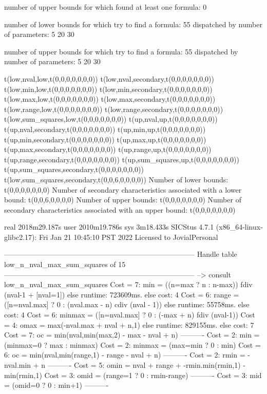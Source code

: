 number of upper bounds for which found at least one formula: 0

number of lower bounds for which try to find a formula: 55
dispatched by number of parameters: 5  20  30

number of upper bounds for which try to find a formula: 55
dispatched by number of parameters: 5  20  30

t(low,nval,low,t(0,0,0,0,0,0,0))
t(low,nval,secondary,t(0,0,0,0,0,0,0))
t(low,min,low,t(0,0,0,0,0,0,0))
t(low,min,secondary,t(0,0,0,0,0,0,0))
t(low,max,low,t(0,0,0,0,0,0,0))
t(low,max,secondary,t(0,0,0,0,0,0,0))
t(low,range,low,t(0,0,0,0,0,0,0))
t(low,range,secondary,t(0,0,0,0,0,0,0))
t(low,sum_squares,low,t(0,0,0,0,0,0,0))
t(up,nval,up,t(0,0,0,0,0,0,0))
t(up,nval,secondary,t(0,0,0,0,0,0,0))
t(up,min,up,t(0,0,0,0,0,0,0))
t(up,min,secondary,t(0,0,0,0,0,0,0))
t(up,max,up,t(0,0,0,0,0,0,0))
t(up,max,secondary,t(0,0,0,0,0,0,0))
t(up,range,up,t(0,0,0,0,0,0,0))
t(up,range,secondary,t(0,0,0,0,0,0,0))
t(up,sum_squares,up,t(0,0,0,0,0,0,0))
t(up,sum_squares,secondary,t(0,0,0,0,0,0,0))
t(low,sum_squares,secondary,t(0,0,6,0,0,0,0))
Number of lower bounds:                                             t(0,0,0,0,0,0,0)
Number of secondary characteristics associated with a lower bound:  t(0,0,6,0,0,0,0)
Number of upper bounds:                                             t(0,0,0,0,0,0,0)
Number of secondary characteristics associated with an upper bound: t(0,0,0,0,0,0,0)

real	2018m29.187s
user	2010m19.786s
sys	3m18.433s
SICStus 4.7.1 (x86_64-linux-glibc2.17): Fri Jan 21 10:45:10 PST 2022
Licensed to JovialPersonal


--------------------------------------------------------------------------------
Handle table low_n_nval_max_sum_squares of 15
--------------------------------------------------------------------------------
--> consult low_n_nval_max_sum_squares
Cost =  7:  min    = ((n=max ? n : n-max)) fdiv (nval-1 + [nval=1]) %
else runtime: 723609ms. else cost: 4
Cost =  6:  range  = ([n=nval.max] ? 0 : (nval.max - n) cdiv (nval - 1)) %
else runtime: 55758ms. else cost: 4
Cost =  6:  minmax = ([n=nval.max] ? 0 : (-max + n) fdiv (nval-1)) %
Cost =  4:  omax   = max(-nval.max + nval + n,1)
else runtime: 829155ms. else cost: 7
Cost =  7:  oc     = min(nval,min(max,2) - max - nval + n) %
----------
Cost =  2:  min    = (minmax=0 ? max : minmax)
Cost =  2:  minmax = (max=min ? 0 : min)
Cost =  6:  oc     = min(nval,min(range,1) - range - nval + n)
----------
Cost =  2:  rmin   = -nval.min + n
----------
Cost =  5:  omin   = nval + range + -rmin.min(rmin,1) - min(rmin,1) %
Cost =  3:  omid   = (range=1 ? 0 : rmin-range)
----------
Cost =  3:  mid    = (omid=0 ? 0 : min+1)
----------

